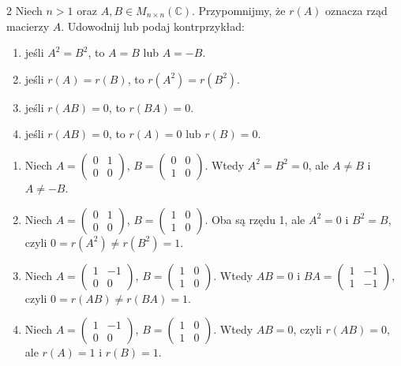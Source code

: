 \documentclass{../note}
\begin{document}
\begin{zadanie}{2}
Niech $n>1$ oraz $A, B\in M_{n\times n}(\mathbb{C})$. Przypomnijmy, że $r(A)$ oznacza rząd macierzy $A$. Udowodnij lub podaj kontrprzykład:
\begin{enumerate}[label=(\alph*)]
    \item jeśli $A^{2}=B^{2}$, to $A=B$ lub $A=-B$.
    \item jeśli $r(A)=r(B)$, to $r(A^{2})=r(B^{2})$.
    \item jeśli $r(AB)=0$, to $r(BA)=0$.
    \item jeśli $r(AB)=0$, to $r(A)=0$ lub $r(B)=0$.
\end{enumerate}
\end{zadanie}
\begin{rozwiazanie}
\begin{enumerate}[label=(\alph*)]
    \item Niech $A = 
    \begin{pmatrix}
        0 & 1 \\
        0 & 0
    \end{pmatrix}$,
    $B = 
    \begin{pmatrix}
        0 & 0 \\
        1 & 0
    \end{pmatrix}$. Wtedy $A^2 = B^2 = 0$, ale $A \neq B$ i $A \neq -B$.
    \item Niech $A = 
    \begin{pmatrix}
        0 & 1 \\
        0 & 0
    \end{pmatrix}$,
    $B = 
    \begin{pmatrix}
        1 & 0 \\
        1 & 0
    \end{pmatrix}$. Oba są rzędu 1, ale $A^2 = 0$ i $B^2 = B$, czyli $0 = r(A^2) \neq r(B^2) = 1$.
    \item Niech $A = 
    \begin{pmatrix}
        1 & -1 \\
        0 & 0
    \end{pmatrix}$,
    $B = 
    \begin{pmatrix}
        1 & 0 \\
        1 & 0
    \end{pmatrix}$. Wtedy $AB = 0$ i $BA =
    \begin{pmatrix}
        1 & -1 \\
        1 & -1
    \end{pmatrix}$, czyli $0 = r(AB) \neq r(BA) = 1$.
    \item Niech $A = 
    \begin{pmatrix}
        1 & -1 \\
        0 & 0
    \end{pmatrix}$,
    $B = 
    \begin{pmatrix}
        1 & 0 \\
        1 & 0
    \end{pmatrix}$. Wtedy $AB = 0$, czyli $r(AB) = 0$, ale $r(A) = 1$ i $r(B) = 1$.
\end{enumerate}
\end{rozwiazanie}
\end{document}
